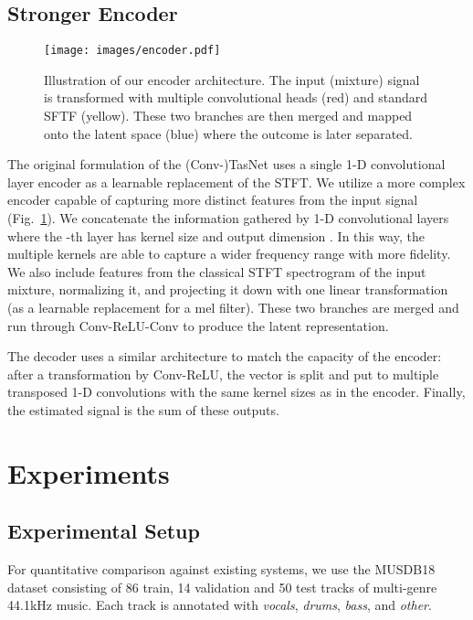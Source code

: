 \documentclass{article}
\begin{document}
\subsection{Stronger Encoder}

\begin{figure}
\centering
\texttt{[image: images/encoder.pdf]}
\caption{Illustration of our encoder architecture. The input (mixture) signal is transformed with multiple convolutional heads (red) and standard SFTF (yellow). These two branches are then merged and mapped onto the latent space (blue) where the outcome is later separated.}
\label{fig:encoder}
\end{figure}

The original formulation of the (Conv-)TasNet uses a single 1-D convolutional layer encoder as a learnable replacement of the STFT. We utilize a more complex encoder capable of capturing more distinct features from the input signal (Fig.~\ref{fig:encoder}).  We concatenate the information gathered by  1-D convolutional layers where the -th layer has kernel size  and output dimension . In this way, the multiple kernels are able to capture a wider frequency range with more fidelity. We also include features from the classical STFT spectrogram of the input mixture, normalizing it, and projecting it down with one linear transformation (as a learnable replacement for a mel filter). These two branches are merged and run through Conv-ReLU-Conv to produce the latent representation.

The decoder uses a similar architecture to match the capacity of the encoder: after a transformation by Conv-ReLU, the vector is split and put to multiple transposed 1-D convolutions with the same kernel sizes as in the encoder. Finally, the estimated signal  is the sum of these outputs.
 \section{Experiments}

\subsection{Experimental Setup}

For quantitative comparison against existing systems, we use the MUSDB18~\cite{musdb18} dataset consisting of 86 train, 14 validation and 50 test tracks of multi-genre 44.1kHz music.  Each track is annotated with \emph{vocals}, \emph{drums}, \emph{bass}, and \emph{other}.  
\end{document}
